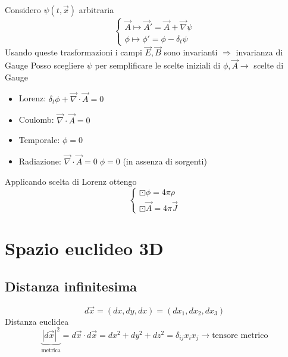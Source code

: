 \documentclass[a4paper,11pt]{report}
\theoremstyle{remark}
\theoremstyle{definition}
\begin{document}
Considero $\psi(t, \vec{x})$ arbitraria
\begin{equation*}
    \begin{cases}
        \vec{A} \mapsto \vec{A}' = \vec{A} + \vec{\nabla}\psi \\
        \phi \mapsto \phi' = \phi - \delta_t \psi 
    \end{cases}
\end{equation*}
Usando queste trasformazioni i campi $\vec{E}, \vec{B}$ sono invarianti $\Rightarrow$ invarianza di Gauge \newline
Posso scegliere $\psi$ per semplificare le scelte iniziali di $\phi,\vec{A} \rightarrow$ scelte di Gauge
\begin{itemize}
    \item Lorenz: $\delta_t \phi + \vec{\nabla} \cdot \vec{A} = 0$
    \item Coulomb: $\vec{\nabla} \cdot \vec{A} = 0$
    \item Temporale: $\phi = 0$
    \item Radiazione: $\vec{\nabla} \cdot \vec{A} = 0 \; \phi = 0$ (in assenza di sorgenti)
\end{itemize}
Applicando scelta di Lorenz ottengo
\begin{equation*}
    \begin{cases}
        \boxdot \phi = 4 \pi \rho \\
        \boxdot \vec{A} = 4 \pi \vec{J}
    \end{cases}
\end{equation*}

\section{Spazio euclideo 3D}

\subsection*{Distanza infinitesima}
\begin{equation*}
    d\vec{x} = (dx,dy,dx) = (dx_1,dx_2,dx_3)
\end{equation*}
Distanza euclidea
\begin{equation*}
    \underbrace{{|d\vec{x}|}^2}_{\text{metrica}} = d\vec{x} \cdot d\vec{x} = dx^2 + dy^2 + dz^2 = \delta_{ij}x_ix_j \rightarrow \text{tensore metrico}
\end{equation*}
\end{document}
